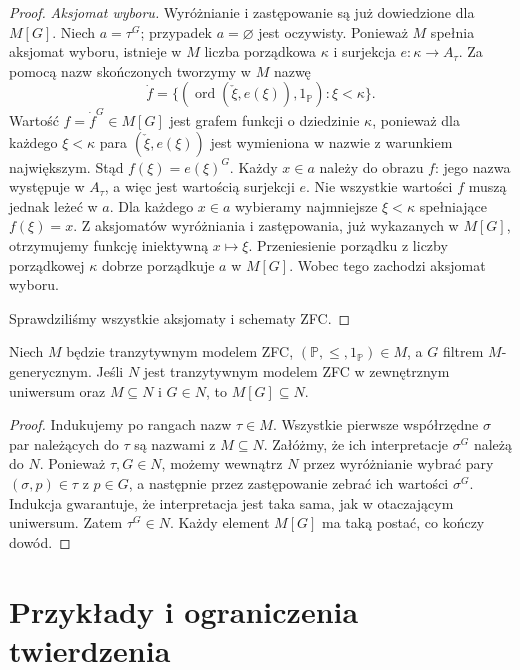 \begin{proof}
\emph{Aksjomat wyboru.}
Wyróżnianie i zastępowanie
są już dowiedzione dla $M[G]$.
Niech $a=\tau^G$; przypadek
$a=\varnothing$ jest oczywisty.
Ponieważ $M$ spełnia aksjomat
wyboru, istnieje w $M$
liczba porządkowa $\kappa$
i surjekcja $e:\kappa\to A_\tau$.
Za pomocą nazw skończonych
tworzymy w $M$ nazwę
\[
 \dot f=\{(\operatorname{ord}(\check\xi,
               e(\xi)),1_{\mathbb P}):
                         \xi<\kappa\}.
\]
Wartość $f=\dot f^G\in M[G]$
jest grafem funkcji o dziedzinie
$\kappa$, ponieważ dla każdego
$\xi<\kappa$ para
$(\check\xi,e(\xi))$ jest wymieniona
w nazwie z warunkiem największym.
Stąd $f(\xi)=e(\xi)^G$.
Każdy $x\in a$ należy do
obrazu $f$: jego nazwa występuje
w $A_\tau$, a więc jest wartością
surjekcji $e$.
Nie wszystkie wartości $f$
muszą jednak leżeć w $a$.
Dla każdego $x\in a$ wybieramy
najmniejsze $\xi<\kappa$ spełniające
$f(\xi)=x$. Z aksjomatów wyróżniania
i zastępowania, już wykazanych
w $M[G]$, otrzymujemy funkcję
iniektywną $x\mapsto\xi$.
Przeniesienie porządku
z liczby porządkowej $\kappa$
dobrze porządkuje $a$ w $M[G]$.
Wobec tego zachodzi aksjomat wyboru.

Sprawdziliśmy wszystkie aksjomaty
i schematy ZFC.
\end{proof}

\begin{twierdzenie}
\label{thm:forcing33-minimal}
Niech $M$ będzie tranzytywnym
modelem ZFC, $(\mathbb P,\leq,1_{\mathbb P})\in M$,
a $G$ filtrem $M$-generycznym.
Jeśli $N$ jest tranzytywnym modelem ZFC
w zewnętrznym uniwersum oraz
$M\subseteq N$ i $G\in N$,
to $M[G]\subseteq N$.
\end{twierdzenie}
\begin{proof}
Indukujemy po rangach nazw $\tau\in M$.
Wszystkie pierwsze współrzędne
$\sigma$ par należących do $\tau$
są nazwami z $M\subseteq N$.
Załóżmy, że ich interpretacje
$\sigma^G$ należą do $N$.
Ponieważ $\tau,G\in N$, możemy
wewnątrz $N$ przez wyróżnianie
wybrać pary $(\sigma,p)\in\tau$
z $p\in G$, a następnie przez
zastępowanie zebrać ich wartości
$\sigma^G$. Indukcja gwarantuje,
że interpretacja jest taka sama,
jak w otaczającym uniwersum.
Zatem $\tau^G\in N$.
Każdy element $M[G]$ ma taką
postać, co kończy dowód.
\end{proof}

\section{Przykłady i ograniczenia twierdzenia}

